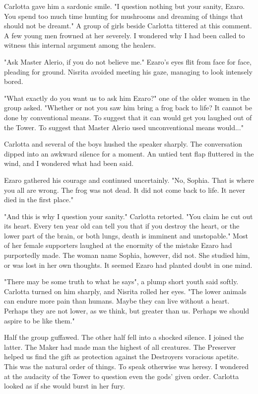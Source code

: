 \documentclass{article}
\begin{document}
Carlotta gave him a sardonic smile. "I question nothing but your sanity, Ezaro. You spend too much time hunting for mushrooms and dreaming of things that should not be dreamt." A group of girls beside Carlotta tittered at this comment. A few young men frowned at her severely. I wondered why I had been called to witness this internal argument among the healers.

"Ask Master Alerio, if you do not believe me." Ezaro's eyes flit from face for face, pleading for ground. Nisrita avoided meeting his gaze, managing to look intensely bored. 

"What exactly do you want us to ask him Ezaro?" one of the older women in the group asked. "Whether or not you saw him bring a frog back to life? It cannot be done by conventional means. To suggest that it can would get you laughed out of the Tower. To suggest that Master Alerio used unconventional means would..."

Carlotta and several of the boys hushed the speaker sharply. The conversation dipped into an awkward silence for a moment. An untied tent flap fluttered in the wind, and I wondered what had been said. 

Ezaro gathered his courage and continued uncertainly. "No, Sophia. That is where you all are wrong. The frog was not dead. It did not come back to life. It never died in the first place."

"And this is why I question your sanity." Carlotta retorted. "You claim he cut out its heart. Every ten year old can tell you that if you destroy the heart, or the lower part of the brain, or both lungs, death is imminent and unstopable." Most of her female supporters laughed at the enormity of the mistake Ezaro had purportedly made. The woman name Sophia, however, did not. She studied him, or was lost in her own thoughts. It seemed Ezaro had planted doubt in one mind. 

"There may be some truth to what he says", a plump short youth said softly. Carlotta turned on him sharply, and Nisrita rolled her eyes. "The lower animals can endure more pain than humans. Maybe they can live without a heart. Perhaps they are not lower, as we think, but greater than us. Perhaps we should aspire to be like them."

Half the group guffawed. The other half fell into a shocked silence. I joined the latter. The Maker had made man the highest of all creatures. The Preserver helped us find the gift as protection against the Destroyers voracious apetite. This was the natural order of things. To speak otherwise was heresy. I wondered at the audacity of the Tower to question even the gods' given order. Carlotta looked as if she would burst in her fury.
\end{document}
